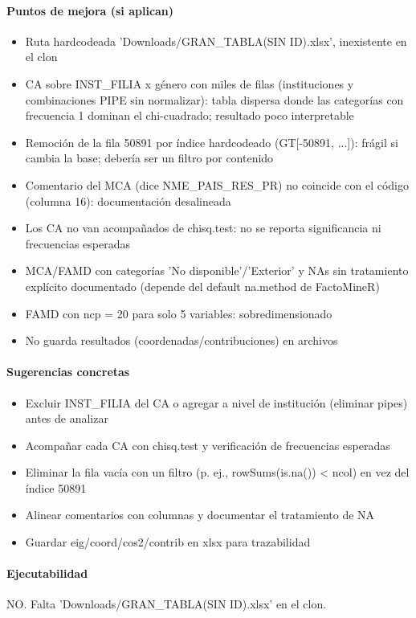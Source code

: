 \paragraph{Puntos de mejora (si aplican)}
\begin{itemize}
  \item Ruta hardcodeada 'Downloads/GRAN\_TABLA(SIN ID).xlsx', inexistente en el clon
  \item CA sobre INST\_FILIA x género con miles de filas (instituciones y combinaciones PIPE sin normalizar): tabla dispersa donde las categorías con frecuencia 1 dominan el chi-cuadrado; resultado poco interpretable
  \item Remoción de la fila 50891 por índice hardcodeado (GT[-50891, ...]): frágil si cambia la base; debería ser un filtro por contenido
  \item Comentario del MCA (dice NME\_PAIS\_RES\_PR) no coincide con el código (columna 16): documentación desalineada
  \item Los CA no van acompañados de chisq.test: no se reporta significancia ni frecuencias esperadas
  \item MCA/FAMD con categorías 'No disponible'/'Exterior' y NAs sin tratamiento explícito documentado (depende del default na.method de FactoMineR)
  \item FAMD con ncp = 20 para solo 5 variables: sobredimensionado
  \item No guarda resultados (coordenadas/contribuciones) en archivos
\end{itemize}

\paragraph{Sugerencias concretas}
\begin{itemize}
  \item Excluir INST\_FILIA del CA o agregar a nivel de institución (eliminar pipes) antes de analizar
  \item Acompañar cada CA con chisq.test y verificación de frecuencias esperadas
  \item Eliminar la fila vacía con un filtro (p. ej., rowSums(is.na()) < ncol) en vez del índice 50891
  \item Alinear comentarios con columnas y documentar el tratamiento de NA
  \item Guardar eig/coord/cos2/contrib en xlsx para trazabilidad
\end{itemize}

\paragraph{Ejecutabilidad}
NO. Falta 'Downloads/GRAN\_TABLA(SIN ID).xlsx' en el clon.


